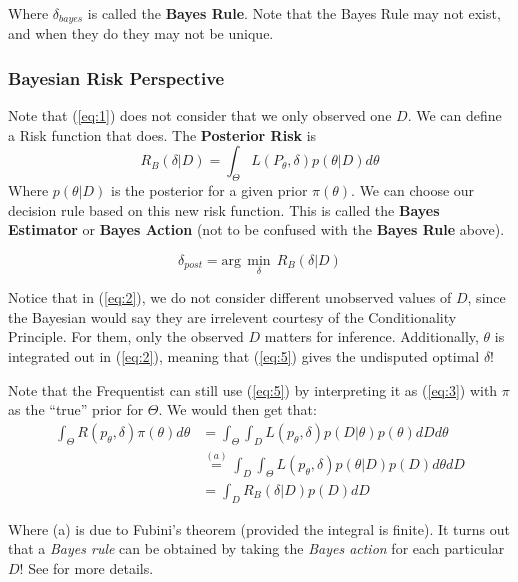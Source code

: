 \documentclass[]{article}
\theoremstyle{mattstyle}
\theoremstyle{definition}
\begin{document}
Where $\delta_{bayes}$ is called the \textbf{Bayes Rule}. Note that the Bayes Rule may not exist, and when they do they may not be unique.

\subsubsection{Bayesian Risk Perspective} 

Note that (\ref{eq:1}) does not consider that we only observed one \(D\). We can define a Risk function that does. The \textbf{Posterior Risk} is
\begin{equation}\label{eq:2}R_B(\delta|D) = \int_{\Theta}^{}L(P_{\theta},\delta)p(\theta|D)d\theta
\end{equation}
Where $p(\theta|D)$ is the posterior for a given prior $\pi(\theta)$. We can choose our decision rule based on this new risk function. This is called the \textbf{Bayes Estimator} or \textbf{Bayes Action} (not to be confused with the \textbf{Bayes Rule} above).

\begin{equation}\label{eq:5}
\delta_{post}= \text{arg}\,\min\limits_{\delta}\,R_B(\delta|D)
\end{equation}


Notice that in (\ref{eq:2}), we do not consider different unobserved values of \(D\), since the Bayesian would say they are irrelevent courtesy of the Conditionality Principle. For them, only the observed $D$ matters for inference. 
Additionally, \(\theta\) is integrated out in (\ref{eq:2}), meaning that (\ref{eq:5}) gives the undisputed optimal \(\delta\)! 

Note that the Frequentist can still use (\ref{eq:5}) by interpreting it as (\ref{eq:3}) with \(\pi\) as the ``true'' prior for \(\Theta\).
We would then get that:
\begin{align*}
 \int_{\Theta}^{}R(p_\theta,\delta)\pi(\theta)d\theta &= \int_{\Theta}^{}\int_{D}L(p_\theta,\delta)p(D|\theta)p(\theta)dDd\theta \\&\overset{(a)}{=} \int_{D}^{}\int_{\Theta}L(p_\theta,\delta)p(\theta|D)p(D)d\theta dD\\
&=\int_{D}^{}R_B(\delta|D)p(D)dD
\end{align*}

Where (a) is due to Fubini's theorem (provided the integral is finite).
It turns out that a \emph{Bayes rule} can be obtained by taking the \emph{Bayes action} for each particular $D$! See \cite{PHoffNotes2} for more details.
\end{document}
